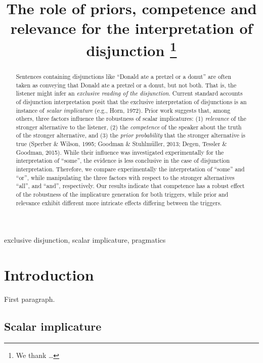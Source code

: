 \documentclass{sp}
\title[Exclusive disjunction]{The role of priors, competence and relevance for the interpretation of disjunction%
  \thanks{We thank \ldots}}
\author[]{%
  \spauthor{Michael Franke \\ \institute{Institute1}} \AND
  \spauthor{Bob van Tiel \\ \institute{Institute2}} \AND
  \spauthor{Polina Tsvilodub \\ \institute{Institute3}}}
\begin{document}
\maketitle

\begin{abstract}
  
  Sentences containing disjunctions like ``Donald ate a pretzel or a donut'' are often taken as conveying that Donald ate a pretzel or a donut, but not both. That is, the listener might infer an \textit{exclusive reading of the disjunction}. Current standard accounts of disjunction interpretation posit that the exclusive interpretation of disjunctions is an instance of \textit{scalar implicature} (e.g., Horn, 1972). Prior work suggests that, among others, three factors influence the robustness of scalar implicatures: (1) \textit{relevance} of the stronger alternative to the listener, (2) the \textit{competence} of the speaker about the truth of the stronger alternative, and (3) the \textit{prior probability} that the stronger alternative is true (Sperber \& Wilson, 1995; Goodman \& Stuhlmüller, 2013; Degen, Tessler \& Goodman, 2015). While their influence was investigated experimentally for the interpretation of ``some'', the evidence is less conclusive in the case of disjunction interpretation. Therefore, we compare experimentally the interpretation of ``some'' and ``or'', while manipulating the three factors with respect to the stronger alternatives “all”, and “and”, respectively. Our results indicate that competence has a robust effect of the robustness of the implicature generation for both triggers, while prior and relevance exhibit different more intricate effects differing between the triggers.
  
\end{abstract}

\begin{keywords}
  exclusive disjunction, scalar implicature, pragmatics
\end{keywords}

\section{Introduction}

First paragraph.

\subsection{Scalar implicature}
\end{document}
